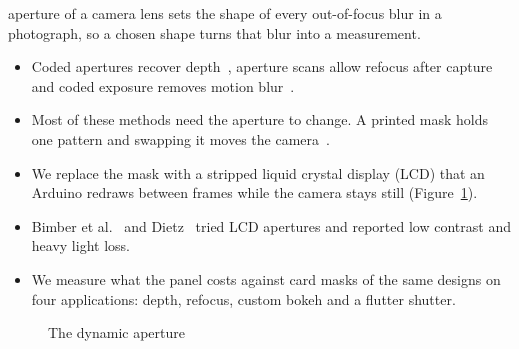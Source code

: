 
 aperture of a camera lens sets the shape of every out-of-focus blur in a photograph, so a chosen shape turns that blur into a measurement.

\begin{itemize}
\item Coded apertures recover depth~\cite{levin2007coded,zhou2009pairs}, aperture scans allow refocus after capture~\cite{liang2008programmable} and coded exposure removes motion blur~\cite{raskar2006coded}.
\item Most of these methods need the aperture to change. A printed mask holds one pattern and swapping it moves the camera~\cite{zhou2011pairsijcv}.
\item We replace the mask with a stripped liquid crystal display (LCD) that an Arduino redraws between frames while the camera stays still (Figure~\ref{fig:teaser}).
\item Bimber et al.~\cite{bimber2011adaptive} and Dietz~\cite{dietz2021lcaperture} tried LCD apertures and reported low contrast and heavy light loss.
\item We measure what the panel costs against card masks of the same designs on four applications: depth, refocus, custom bokeh and a flutter shutter.
\end{itemize}

\begin{figure}[!t]
\centering
{}
\caption{The dynamic aperture }
\label{fig:teaser}
\end{figure}
